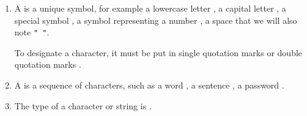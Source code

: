 \documentclass[11pt,class=report,crop=false]{standalone}
\begin{document}
\newcommand{\badletter}[1]{\underline{\textcolor{red}{#1}}}






\begin{cours}
\sauteligne
\begin{enumerate}
  \item A  is a unique symbol, for example a lowercase letter , a capital letter , a special symbol , a symbol representing a number , a space  that we will also note \lstinline[showstringspaces=true]!" "!.
  
To designate a character, it must be put in single quotation marks  or double quotation marks .
  
  \item A  is a sequence of characters, such as a word , a sentence , a password \codeinline{"N[w5ms\}e\!"}.
  
  \item The type of a character or string is .

\end{enumerate}  
\end{cours}


\end{document}
